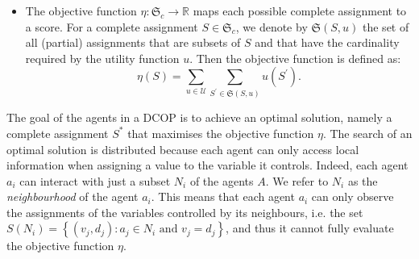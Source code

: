\begin{itemize}

\item The objective function $\eta: \mathfrak{S}_c \rightarrow \mathbb{R}$ maps each possible complete assignment to a score. For a complete assignment $S \in \mathfrak{S}_c$, we denote by $\mathfrak{S}(S,u)$ the set of all (partial) assignments that are subsets of $S$ and that have the cardinality required by the utility function $u$. Then the objective function is defined as:
$$
\eta(S) = \sum_{u\in\mathcal{U}}\sum_{S^{\prime} \in \mathfrak{S}(S,u)} u(S^{\prime}).%
$$
\end{itemize}

The goal of the agents in a DCOP is to achieve an optimal solution, namely a complete assignment $S^*$ that maximises the objective function $\eta$. The search of an optimal solution is distributed because each agent can only access local information when assigning a value to the variable it controls. Indeed, each agent $a_i$ can interact with just a subset $N_i$ of the agents $A$. We refer to $N_i$ as the \emph{neighbourhood} of the agent $a_i$. This means that each agent $a_i$ can only observe the assignments of the variables controlled by its neighbours, i.e. the set $S(N_i) = \left\{ (v_j, d_j): a_j \in N_i \text{ and } v_j=d_j \right\}$, and thus it cannot fully evaluate the objective function $\eta$.



